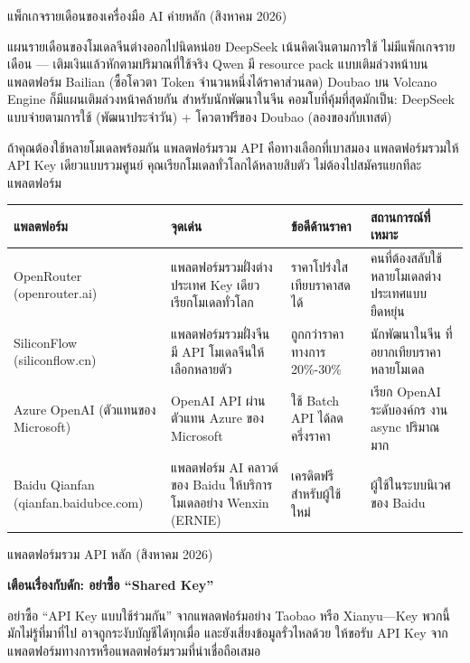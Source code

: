 \begin{center}\small\color{gray}แพ็กเกจรายเดือนของเครื่องมือ AI ค่ายหลัก (สิงหาคม 2026)\end{center}

แผนรายเดือนของโมเดลจีนต่างออกไปนิดหน่อย DeepSeek เน้นคิดเงินตามการใช้ ไม่มีแพ็กเกจรายเดือน — เติมเงินแล้วหักตามปริมาณที่ใช้จริง Qwen มี resource pack แบบเติมล่วงหน้าบนแพลตฟอร์ม Bailian (ซื้อโควตา Token จำนวนหนึ่งได้ราคาส่วนลด) Doubao บน Volcano Engine ก็มีแผนเติมล่วงหน้าคล้ายกัน สำหรับนักพัฒนาในจีน คอมโบที่คุ้มที่สุดมักเป็น: DeepSeek แบบจ่ายตามการใช้ (พัฒนาประจำวัน) + โควตาฟรีของ Doubao (ลองของกับเทสต์)


ถ้าคุณต้องใช้หลายโมเดลพร้อมกัน แพลตฟอร์มรวม API คือทางเลือกที่เบาสมอง แพลตฟอร์มรวมให้ API Key เดียวแบบรวมศูนย์ คุณเรียกโมเดลทั่วโลกได้หลายสิบตัว ไม่ต้องไปสมัครแยกทีละแพลตฟอร์ม

\begin{center}
\begin{tabularx}{\linewidth}{|X|X|X|X|}
\hline
\textbf{แพลตฟอร์ม} & \textbf{จุดเด่น} & \textbf{ข้อดีด้านราคา} & \textbf{สถานการณ์ที่เหมาะ} \tabularnewline
\hline
OpenRouter (openrouter.ai) & แพลตฟอร์มรวมฝั่งต่างประเทศ Key เดียวเรียกโมเดลทั่วโลก & ราคาโปร่งใส เทียบราคาสดได้ & คนที่ต้องสลับใช้หลายโมเดลต่างประเทศแบบยืดหยุ่น \tabularnewline
SiliconFlow (siliconflow.cn) & แพลตฟอร์มรวมฝั่งจีน มี API โมเดลจีนให้เลือกหลายตัว & ถูกกว่าราคาทางการ 20\%-30\% & นักพัฒนาในจีน ที่อยากเทียบราคาหลายโมเดล \tabularnewline
Azure OpenAI (ตัวแทนของ Microsoft) & OpenAI API ผ่านตัวแทน Azure ของ Microsoft & ใช้ Batch API ได้ลดครึ่งราคา & เรียก OpenAI ระดับองค์กร งาน async ปริมาณมาก \tabularnewline
Baidu Qianfan (qianfan.baidubce.com) & แพลตฟอร์ม AI คลาวด์ของ Baidu ให้บริการโมเดลอย่าง Wenxin (ERNIE) & เครดิตฟรีสำหรับผู้ใช้ใหม่ & ผู้ใช้ในระบบนิเวศของ Baidu \tabularnewline
\hline
\end{tabularx}
\end{center}

\begin{center}\small\color{gray}แพลตฟอร์มรวม API หลัก (สิงหาคม 2026)\end{center}

\textbf{เตือนเรื่องกับดัก: อย่าซื้อ “Shared Key”}\par

อย่าซื้อ “API Key แบบใช้ร่วมกัน” จากแพลตฟอร์มอย่าง Taobao หรือ Xianyu—Key พวกนี้มักไม่รู้ที่มาที่ไป อาจถูกระงับบัญชีได้ทุกเมื่อ และยังเสี่ยงข้อมูลรั่วไหลด้วย ให้ขอรับ API Key จากแพลตฟอร์มทางการหรือแพลตฟอร์มรวมที่น่าเชื่อถือเสมอ


